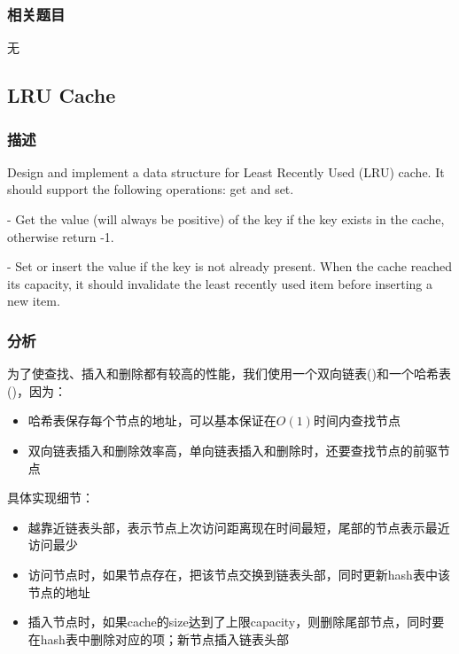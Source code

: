\subsubsection{相关题目}
\begindot
\item 无
\myenddot


\subsection{LRU Cache}
\label{sec:LRU-Cachet}


\subsubsection{描述}
Design and implement a data structure for Least Recently Used (LRU) cache. It should support the following operations: get and set.

 - Get the value (will always be positive) of the key if the key exists in the cache, otherwise return -1.

 - Set or insert the value if the key is not already present. When the cache reached its capacity, it should invalidate the least recently used item before inserting a new item.


\subsubsection{分析}
为了使查找、插入和删除都有较高的性能，我们使用一个双向链表()和一个哈希表()，因为：
\begin{itemize}
\item{哈希表保存每个节点的地址，可以基本保证在$O(1)$时间内查找节点}
\item{双向链表插入和删除效率高，单向链表插入和删除时，还要查找节点的前驱节点}
\end{itemize}

具体实现细节：
\begin{itemize}
\item{越靠近链表头部，表示节点上次访问距离现在时间最短，尾部的节点表示最近访问最少}
\item{访问节点时，如果节点存在，把该节点交换到链表头部，同时更新hash表中该节点的地址}
\item{插入节点时，如果cache的size达到了上限capacity，则删除尾部节点，同时要在hash表中删除对应的项；新节点插入链表头部}              
\end{itemize}


